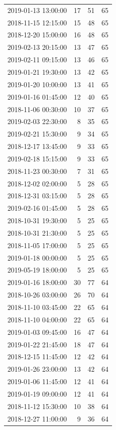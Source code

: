 \begin{tabular}{lrrr}
2019-01-13 13:00:00 & 17 & 51 & 65 \\
2018-11-15 12:15:00 & 15 & 48 & 65 \\
2018-12-20 15:00:00 & 16 & 48 & 65 \\
2019-02-13 20:15:00 & 13 & 47 & 65 \\
2019-02-11 09:15:00 & 13 & 46 & 65 \\
2019-01-21 19:30:00 & 13 & 42 & 65 \\
2019-01-20 10:00:00 & 13 & 41 & 65 \\
2019-01-16 01:45:00 & 12 & 40 & 65 \\
2018-11-06 00:30:00 & 10 & 37 & 65 \\
2019-02-03 22:30:00 & 8 & 35 & 65 \\
2019-02-21 15:30:00 & 9 & 34 & 65 \\
2018-12-17 13:45:00 & 9 & 33 & 65 \\
2019-02-18 15:15:00 & 9 & 33 & 65 \\
2018-11-23 00:30:00 & 7 & 31 & 65 \\
2018-12-02 02:00:00 & 5 & 28 & 65 \\
2018-12-31 03:15:00 & 5 & 28 & 65 \\
2019-02-16 01:45:00 & 5 & 28 & 65 \\
2018-10-31 19:30:00 & 5 & 25 & 65 \\
2018-10-31 21:30:00 & 5 & 25 & 65 \\
2018-11-05 17:00:00 & 5 & 25 & 65 \\
2019-01-18 00:00:00 & 5 & 25 & 65 \\
2019-05-19 18:00:00 & 5 & 25 & 65 \\
2019-01-16 18:00:00 & 30 & 77 & 64 \\
2018-10-26 03:00:00 & 26 & 70 & 64 \\
2018-11-10 03:45:00 & 22 & 65 & 64 \\
2018-11-10 04:00:00 & 22 & 65 & 64 \\
2019-01-03 09:45:00 & 16 & 47 & 64 \\
2019-01-22 21:45:00 & 18 & 47 & 64 \\
2018-12-15 11:45:00 & 12 & 42 & 64 \\
2019-01-26 23:00:00 & 13 & 42 & 64 \\
2019-01-06 11:45:00 & 12 & 41 & 64 \\
2019-01-19 09:00:00 & 12 & 41 & 64 \\
2018-11-12 15:30:00 & 10 & 38 & 64 \\
2018-12-27 11:00:00 & 9 & 36 & 64 \\

\end{tabular}
